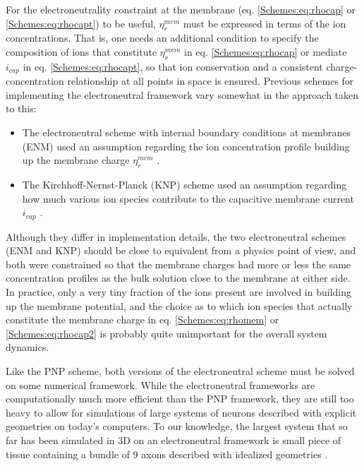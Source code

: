 For the electroneutrality constraint at the membrane (eq. \ref{Schemes:eq:rhocap} or \ref{Schemes:eq:rhocapt}) to be useful, $\eta_{r}^{mem}$ must be expressed in terms of the ion concentrations. That is, one needs an additional condition to specify the composition of ions that constitute $\eta_{r}^{mem}$ in eq. \ref{Schemes:eq:rhocap} or mediate $i_{cap}$ in eq. \ref{Schemes:eq:rhocapt}, so that ion conservation and a consistent charge-concentration relationship  at all points in space is ensured. Previous schemes for implementing the electroneutral framework vary somewhat in the approach taken to this:

\begin{itemize}
\item The electroneutral scheme with internal boundary conditions at membranes (ENM) used an assumption regarding the ion concentration profile building up the membrane charge $\eta_{r}^{mem}$  \citep{Mori2006, Mori2009, Pods2017}.

\item The Kirchhoff-Nernst-Planck (KNP) scheme used an assumption regarding how much various ion species contribute to the capacitive membrane current $i_{cap}$ \citep{ellingsrud2020}. 
\end{itemize}

Although they differ in implementation details, the two electroneutral schemes (ENM and KNP) should be close to equivalent from a physics point of view, and both were constrained so that the membrane charges had more or less the same concentration profiles as the bulk solution close to the membrane at either side. In practice, only a very tiny fraction of the ions present are involved in building up the membrane potential, and the choice as to which ion species that actually constitute the membrane charge in eq. \ref{Schemes:eq:rhomem} or \ref{Schemes:eq:rhocap2} is probably quite unimportant for the overall system dynamics.

Like the PNP scheme, both versions of the electroneutral scheme must be solved on some numerical framework. While the electroneutral frameworks are computationally much more efficient than the PNP framework, they are still too heavy to allow for simulations of large systems of neurons described with explicit geometries on today's computers. To our knowledge, the largest system that so far has been simulated in 3D on an electroneutral framework is small piece of tissue containing a bundle of 9 axons described with idealized geometries \citep{ellingsrud2020}.


